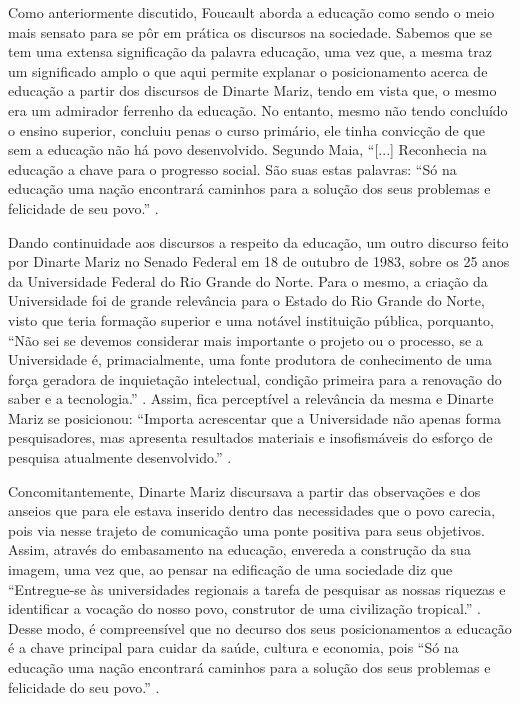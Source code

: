 \begin{refsection}
    Como anteriormente discutido, Foucault aborda a educação como sendo o meio mais sensato para se pôr em prática os discursos na sociedade. Sabemos que se tem uma extensa significação da palavra educação, uma vez que, a mesma traz um significado amplo o que aqui permite explanar o posicionamento acerca de educação a partir dos discursos de Dinarte Mariz, tendo em vista que, o mesmo era um admirador ferrenho da educação. No entanto, mesmo não tendo concluído o ensino superior, concluiu penas o curso primário, ele tinha convicção de que sem a educação não há povo desenvolvido. Segundo Maia, ``[...] Reconhecia na educação a chave para o progresso social. São suas estas palavras: ``Só na educação uma nação encontrará caminhos para a solução dos seus problemas e felicidade de seu povo.'' \cite[p.~39]{Maia2005Dinarte}.

    Dando continuidade aos discursos a respeito da educação, um outro discurso feito por Dinarte Mariz no Senado Federal em 18 de outubro de 1983, sobre os 25 anos da Universidade Federal do Rio Grande do Norte. Para o mesmo, a criação da Universidade foi de grande relevância para o Estado do Rio Grande do Norte, visto que teria formação superior e uma notável instituição pública, porquanto, ``Não sei se devemos considerar mais importante o projeto ou o processo, se a Universidade é, primacialmente, uma fonte produtora de conhecimento de uma força geradora de inquietação intelectual, condição primeira para a renovação do saber e a tecnologia.'' \cite[p.~200]{Maia2005Dinarte}. Assim, fica perceptível a relevância da mesma e Dinarte Mariz se posicionou: ``Importa acrescentar que a Universidade não apenas forma pesquisadores, mas apresenta resultados materiais e insofismáveis do esforço de pesquisa atualmente desenvolvido.'' \cite[p.~200]{Maia2005Dinarte}.

    Concomitantemente, Dinarte Mariz discursava a partir das observações e dos anseios que para ele estava inserido dentro das necessidades que o povo carecia, pois via nesse trajeto de comunicação uma ponte positiva para seus objetivos. Assim, através do embasamento na educação, envereda a construção da sua imagem, uma vez que, ao pensar na edificação de uma sociedade diz que ``Entregue-se às universidades regionais a tarefa de pesquisar as nossas riquezas e identificar a vocação do nosso povo, construtor de uma civilização tropical.'' \cite[p.~67]{Lima2003Solidao}. Desse modo, é compreensível que no decurso dos seus posicionamentos a educação é a chave principal para cuidar da saúde, cultura e economia, pois ``Só na educação uma nação encontrará caminhos para a solução dos seus problemas e felicidade do seu povo.'' \cite[p.~66]{Lima2003Solidao}.


\end{refsection}
